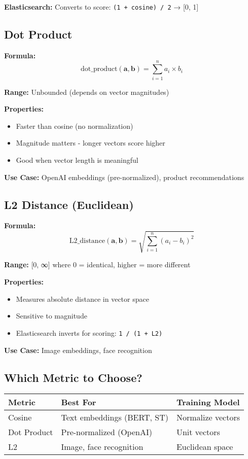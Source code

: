 \documentclass[10pt]{article}
\begin{document}
\textbf{Elasticsearch:} Converts to score: \texttt{(1 + cosine) / 2} → [0, 1]

\subsection{Dot Product}

\textbf{Formula:}
\[
\text{dot\_product}(\mathbf{a}, \mathbf{b}) = \sum_{i=1}^{n} a_i \times b_i
\]

\textbf{Range:} Unbounded (depends on vector magnitudes)

\textbf{Properties:}
\begin{itemize}
\item Faster than cosine (no normalization)
\item Magnitude matters - longer vectors score higher
\item Good when vector length is meaningful
\end{itemize}

\textbf{Use Case:} OpenAI embeddings (pre-normalized), product recommendations

\subsection{L2 Distance (Euclidean)}

\textbf{Formula:}
\[
\text{L2\_distance}(\mathbf{a}, \mathbf{b}) = \sqrt{\sum_{i=1}^{n} (a_i - b_i)^2}
\]

\textbf{Range:} [0, ∞] where 0 = identical, higher = more different

\textbf{Properties:}
\begin{itemize}
\item Measures absolute distance in vector space
\item Sensitive to magnitude
\item Elasticsearch inverts for scoring: \texttt{1 / (1 + L2)}
\end{itemize}

\textbf{Use Case:} Image embeddings, face recognition

\subsection{Which Metric to Choose?}

\begin{tabular}{|l|l|l|}
\hline
\textbf{Metric} & \textbf{Best For} & \textbf{Training Model} \\
\hline
Cosine & Text embeddings (BERT, ST) & Normalize vectors \\
Dot Product & Pre-normalized (OpenAI) & Unit vectors \\
L2 & Image, face recognition & Euclidean space \\
\hline
\end{tabular}
\end{document}
